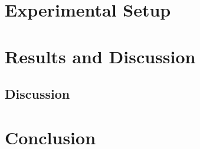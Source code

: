\documentclass[11pt]{article}
\begin{document}
\section{Experimental Setup}

\section{Results and Discussion}

\subsection{Discussion}

\section{Conclusion}



\end{document}
